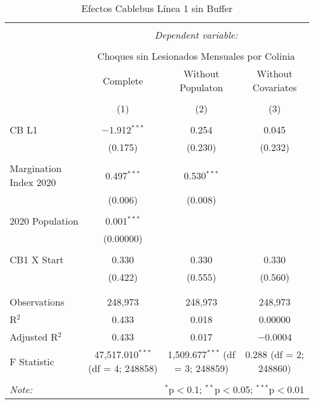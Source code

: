 
\begin{table}[!htbp] \centering 
  \caption{Efectos Cablebus Línea 1 sin Buffer} 
  \label{} 
\begin{tabular}{@{\extracolsep{5pt}}lccc} 
\\[-1.8ex]\hline 
\hline \\[-1.8ex] 
 & \multicolumn{3}{c}{\textit{Dependent variable:}} \\ 
\cline{2-4} 
\\[-1.8ex] & \multicolumn{3}{c}{Choques sin Lesionados Mensuales por Colinia} \\ 
 & Complete & Without Populaton & Without Covariates \\ 
\\[-1.8ex] & (1) & (2) & (3)\\ 
\hline \\[-1.8ex] 
 CB L1 & $-$1.912$^{***}$ & 0.254 & 0.045 \\ 
  & (0.175) & (0.230) & (0.232) \\ 
  & & & \\ 
 Margination Index 2020 & 0.497$^{***}$ & 0.530$^{***}$ &  \\ 
  & (0.006) & (0.008) &  \\ 
  & & & \\ 
 2020 Population & 0.001$^{***}$ &  &  \\ 
  & (0.00000) &  &  \\ 
  & & & \\ 
 CB1 X Start & 0.330 & 0.330 & 0.330 \\ 
  & (0.422) & (0.555) & (0.560) \\ 
  & & & \\ 
\hline \\[-1.8ex] 
Observations & 248,973 & 248,973 & 248,973 \\ 
R$^{2}$ & 0.433 & 0.018 & 0.00000 \\ 
Adjusted R$^{2}$ & 0.433 & 0.017 & $-$0.0004 \\ 
F Statistic & 47,517.010$^{***}$ (df = 4; 248858) & 1,509.677$^{***}$ (df = 3; 248859) & 0.288 (df = 2; 248860) \\ 
\hline 
\hline \\[-1.8ex] 
\textit{Note:}  & \multicolumn{3}{r}{$^{*}$p$<$0.1; $^{**}$p$<$0.05; $^{***}$p$<$0.01} \\ 
\end{tabular} 
\end{table} 
